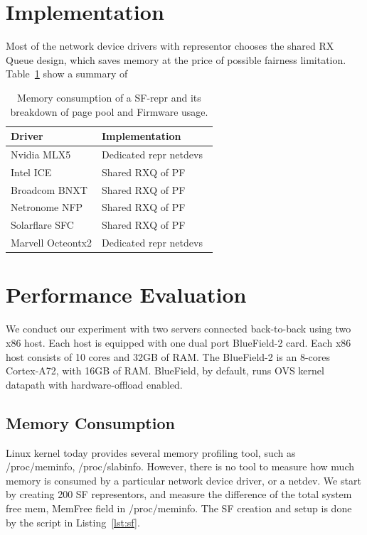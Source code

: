 \documentclass[letterpaper]{article}
\begin{document}
\section{Implementation}
Most of the network device drivers with representor chooses the shared
RX Queue design, which saves memory at the price of possible
fairness limitation. Table~\ref{tab:vendors} show a summary of 
\begin{table}[h!]
\centering
\footnotesize
\begin{tabular}{|l|l|} \hline
\textbf{Driver} &  \textbf{Implementation}\\ \hline \hline
Nvidia MLX5 & Dedicated repr netdevs \\ \hline
Intel ICE & Shared RXQ of PF~\cite{icepatch} \\ \hline
Broadcom BNXT & Shared RXQ of PF ~\cite{survey} \\ \hline
Netronome NFP & Shared RXQ of PF~\cite{survey} \\ \hline
Solarflare SFC &  Shared RXQ of PF~\cite{survey} \\ \hline
Marvell Octeontx2 & Dedicated repr netdevs~\cite{octeontx2} \\ \hline
\end{tabular}
\caption{Memory consumption of a SF-repr and its breakdown of page pool and Firmware usage.}
\label{tab:vendors}
\end{table}


\section{Performance Evaluation}
We conduct our experiment with two servers connected back-to-back using
two x86 host. Each host is equipped with one dual port BlueField-2 card.
Each x86 host consists of 10 cores and 32GB of RAM. The BlueField-2
is an 8-cores Cortex-A72, with 16GB of RAM. BlueField, by default, runs OVS kernel
datapath with hardware-offload enabled.

\subsection{Memory Consumption}
Linux kernel today provides several memory profiling tool, such as /proc/meminfo,
/proc/slabinfo. However, there is no tool to measure how much memory is consumed
by a particular network device driver, or a netdev. We start by creating 200 SF representors,
and measure the difference of the total system free mem, MemFree field in /proc/meminfo.
The SF creation and setup is done by the script in Listing~\ref{lst:sf}.
\end{document}
